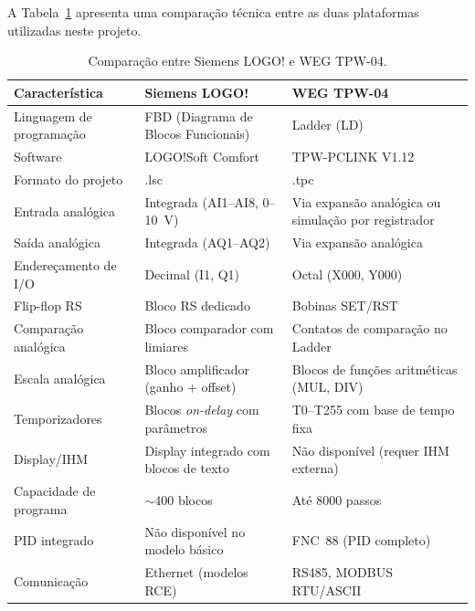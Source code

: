 \documentclass[
  12pt,
  openright,
  oneside,
  a4paper,
  chapter=TITLE,
  section=TITLE,
  brazilian
]{abntex2}
\begin{document}
A Tabela~\ref{tab:comparacao} apresenta uma compara\c{c}\~{a}o t\'{e}cnica entre as duas plataformas utilizadas neste projeto.

\begin{table}[htbp]
\centering
\caption{Compara\c{c}\~{a}o entre Siemens LOGO! e WEG TPW-04.}
\label{tab:comparacao}
\small
\begin{tabular}{p{4cm}p{5cm}p{5cm}}
\toprule
\textbf{Caracter\'{i}stica} & \textbf{Siemens LOGO!} & \textbf{WEG TPW-04} \\
\midrule
Linguagem de programa\c{c}\~{a}o & FBD (Diagrama de Blocos Funcionais) & Ladder (LD) \\
\addlinespace
Software & LOGO!Soft Comfort & TPW-PCLINK V1.12 \\
\addlinespace
Formato do projeto & .lsc & .tpc \\
\addlinespace
Entrada anal\'{o}gica & Integrada (AI1--AI8, 0--10~V) & Via expans\~{a}o anal\'{o}gica ou simula\c{c}\~{a}o por registrador \\
\addlinespace
Sa\'{i}da anal\'{o}gica & Integrada (AQ1--AQ2) & Via expans\~{a}o anal\'{o}gica \\
\addlinespace
Endere\c{c}amento de I/O & Decimal (I1, Q1) & Octal (X000, Y000) \\
\addlinespace
Flip-flop RS & Bloco RS dedicado & Bobinas SET/RST \\
\addlinespace
Compara\c{c}\~{a}o anal\'{o}gica & Bloco comparador com limiares & Contatos de compara\c{c}\~{a}o no Ladder \\
\addlinespace
Escala anal\'{o}gica & Bloco amplificador (ganho + offset) & Blocos de fun\c{c}\~{o}es aritm\'{e}ticas (MUL, DIV) \\
\addlinespace
Temporizadores & Blocos \textit{on-delay} com par\^{a}metros & T0--T255 com base de tempo fixa \\
\addlinespace
Display/IHM & Display integrado com blocos de texto & N\~{a}o dispon\'{i}vel (requer IHM externa) \\
\addlinespace
Capacidade de programa & $\sim$400 blocos & At\'{e} 8000 passos \\
\addlinespace
PID integrado & N\~{a}o dispon\'{i}vel no modelo b\'{a}sico & FNC~88 (PID completo) \\
\addlinespace
Comunica\c{c}\~{a}o & Ethernet (modelos RCE) & RS485, MODBUS RTU/ASCII \\
\bottomrule
\end{tabular}
\end{table}
\end{document}
